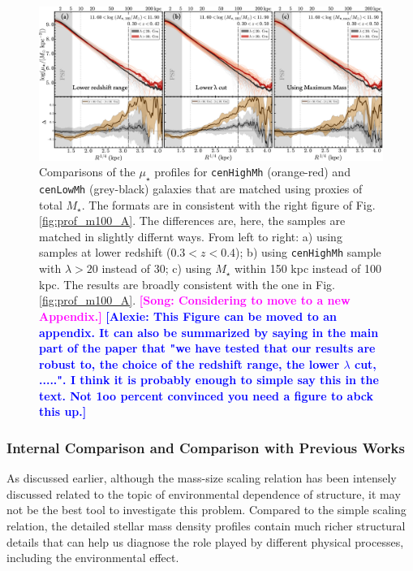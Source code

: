 \documentclass{emulateapj}
\def\rbcg{\texttt{cenHighMh}}
\def\nbcg{\texttt{cenLowMh}}
\def\mstar{{$M_{\star}$}}
\def\mden{{$\mu_{\star}$}}
\newcommand{\song}[1]{\textcolor{magenta}{\textbf{[Song: #1]}}}
\newcommand{\alexie}[1]{\textcolor{blue}{\textbf{[Alexie: #1]}}}
\begin{document}
\begin{CJK*}{UTF8}{gbsn}
  \begin{figure}[t!]
      \centering 
      \includegraphics[width=\textwidth]{fig/redbcg_prof_m100B}
      \caption{Comparisons of the \mden{} profiles for \rbcg{} (orange-red) and \nbcg{} 
      	(grey-black) galaxies that are matched using proxies of total \mstar{}. 
        The formats are in consistent with the right figure of Fig.\ref{fig:prof_m100_A}.
        The differences are, here, the samples are matched in slightly differnt ways. 
        From left to right: a) using samples at lower redshift ($0.3 < z < 0.4$); 
        b) using \rbcg{} sample with $\lambda > 20$ instead of 30; 
        c) using \mstar{} within 150 kpc instead of 100 kpc.
        The results are broadly consistent with the one in Fig.\ref{fig:prof_m100_A}.
        \song{Considering to move to a new Appendix.} \alexie{This Figure can be moved to an appendix. It can also be summarized by saying in the main part of the paper that "we have tested that our results are robust to, the choice of the redshift range, the lower $\lambda$ cut, .....". I think it is probably enough to simple say this in the text. Not 1oo percent convinced you need a figure to abck this up.}}
      \label{fig:prof_m100_B}
  \end{figure}

\subsubsection{Internal Comparison and Comparison with Previous Works}
    \label{sssec:sbp_inter}
    
    As discussed earlier, although the mass-size scaling relation has been intensely 
    discussed related to the topic of environmental dependence of structure, it may not be 
    the best tool to investigate this problem.    
    Compared to the simple scaling relation, the detailed stellar mass density profiles 
    contain much richer structural details that can help us diagnose the role played by 
    different physical processes, including the environmental effect.  
    

\end{CJK*}
\end{document}
